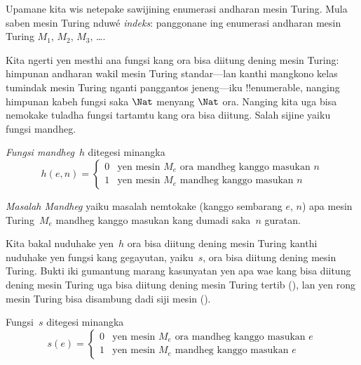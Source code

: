 \documentclass[../../../include/open-logic-section]{subfiles}
\begin{document}

\begin{explain}
Upamane kita wis netepake sawijining enumerasi
andharan mesin Turing. Mula saben mesin Turing
nduwé \emph{indeks}: panggonane ing enumerasi
andharan mesin Turing $M_1$, $M_2$, $M_3$, \dots{}.

Kita ngerti yen mesthi ana fungsi kang ora bisa
diitung dening mesin Turing: himpunan andharan
wakil mesin Turing standar---lan kanthi mangkono kelas tumindak mesin
Turing nganti panggantos jeneng---iku !!{enumerable}, nanging himpunan
kabeh fungsi saka $\Nat$ menyang $\Nat$ ora.
Nanging kita uga bisa nemokake tuladha fungsi
tartamtu kang ora bisa diitung. Salah sijine
yaiku fungsi mandheg.
\end{explain}

\begin{defn}
 \emph{Fungsi mandheg}~$h$ ditegesi minangka
\[
h(e,n) =
\begin{cases}
  \text{0} & \text{yen mesin~$M_e$ ora mandheg kanggo masukan $n$} \\
  \text{1} & \text{yen mesin~$M_e$ mandheg kanggo masukan $n$}
\end{cases}
\]
\end{defn}

\begin{defn}
\emph{Masalah Mandheg} yaiku masalah nemtokake
(kanggo sembarang $e$, $n$) apa mesin Turing~$M_e$
mandheg kanggo masukan kang dumadi saka~$n$ guratan.
\end{defn}

\begin{explain}
Kita bakal nuduhake yen~$h$ ora bisa diitung
dening mesin Turing kanthi nuduhake yen fungsi
kang gegayutan, yaiku~$s$, ora bisa diitung
dening mesin Turing. Bukti iki gumantung marang
kasunyatan yen apa wae kang bisa diitung dening
mesin Turing uga bisa diitung dening mesin Turing
tertib (), lan yen rong mesin
Turing bisa disambung dadi siji mesin
().
\end{explain}

\begin{defn} Fungsi~$s$ ditegesi minangka
\[
s(e) =
\begin{cases}
  \text{0} & \text{yen mesin~$M_e$ ora mandheg kanggo masukan $e$} \\
  \text{1} & \text{yen mesin~$M_e$ mandheg kanggo masukan $e$}
\end{cases}
\]
\end{defn}
\end{document}
